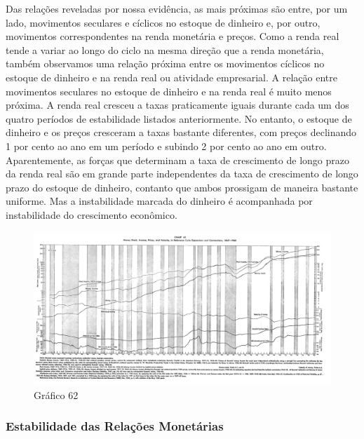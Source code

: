 \documentclass[a4paper,12pt]{article}[abntex2]
\begin{document}
Das relações reveladas por nossa evidência, as mais próximas são entre, por um lado, movimentos seculares e cíclicos no estoque de dinheiro e, por outro, movimentos correspondentes na renda monetária e preços. Como a renda real tende a variar ao longo do ciclo na mesma direção que a renda monetária, também observamos uma relação próxima entre os movimentos cíclicos no estoque de dinheiro e na renda real ou atividade empresarial. A relação entre movimentos seculares no estoque de dinheiro e na renda real é muito menos próxima. A renda real cresceu a taxas praticamente iguais durante cada um dos quatro períodos de estabilidade listados anteriormente. No entanto, o estoque de dinheiro e os preços cresceram a taxas bastante diferentes, com preços declinando 1 por cento ao ano em um período e subindo 2 por cento ao ano em outro. Aparentemente, as forças que determinam a taxa de crescimento de longo prazo da renda real são em grande parte independentes da taxa de crescimento de longo prazo do estoque de dinheiro, contanto que ambos prossigam de maneira bastante uniforme. Mas a instabilidade marcada do dinheiro é acompanhada por instabilidade do crescimento econômico.

\begin{figure}[H]
    \centering
    \caption{Gráfico 62}
    \includegraphics[width=1.0\textwidth]{4º Período/História do Pensamento Econômico/Tradução HPE/Tradução Tópico 9.1/Gráfico 62.png}
    \end{figure}
    
\subsubsection{\textbf{Estabilidade das Relações Monetárias}}
\end{document}
